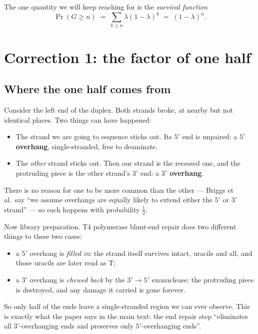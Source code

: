 \documentclass[11pt,a4paper]{article}
\begin{document}
The one quantity we will keep reaching for is the \emph{survival function}
\begin{equation}
\Pr(G \geq n) \;=\; \sum_{k \geq n} \lambda(1-\lambda)^k \;=\; (1-\lambda)^n .
\label{eq:surv}
\end{equation}

\section{Correction 1: the factor of one half}

\subsection{Where the one half comes from}

Consider the left end of the duplex. Both strands broke, at nearby but not identical
places. Two things can have happened:

\begin{itemize}
\item The strand we are going to sequence sticks out. Its $5'$ end is unpaired: a
      \textbf{$5'$ overhang}, single-stranded, free to deaminate.
\item The \emph{other} strand sticks out. Then our strand is the recessed one, and the
      protruding piece is the other strand's $3'$ end: a \textbf{$3'$ overhang}.
\end{itemize}

There is no reason for one to be more common than the other --- Briggs et al.\ say
``we assume overhangs are equally likely to extend either the $5'$ or $3'$ strand''
--- so each happens with probability $\tfrac12$.

Now library preparation. T4 polymerase blunt-end repair does two different things to
these two cases:
\begin{itemize}
\item a $5'$ overhang is \emph{filled in}: the strand itself survives intact, uracils
      and all, and those uracils are later read as T;
\item a $3'$ overhang is \emph{chewed back} by the $3' \!\to\! 5'$ exonuclease: the
      protruding piece is destroyed, and any damage it carried is gone forever.
\end{itemize}

So only half of the ends leave a single-stranded region we can ever observe. This is
exactly what the paper says in the main text: the end repair step ``eliminates all
$3'$-overhanging ends and preserves only $5'$-overhanging ends''.
\end{document}
